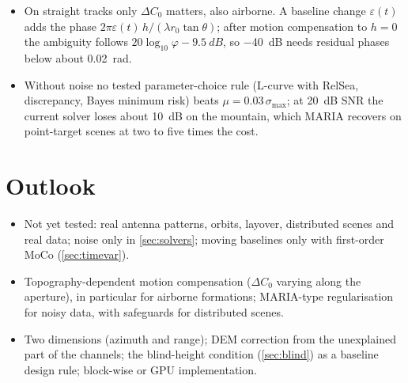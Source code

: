 \begin{itemize}
  \item On straight tracks only $\Delta C_0$ matters, also airborne. A baseline change $\varepsilon(t)$ adds the phase
        $2\pi\varepsilon(t)\,h/(\lambda r_0\tan\theta)$; after motion compensation to $h=0$ the ambiguity follows
        $20\log_{10}\varphi-\SI{9.5}{dB}$, so \SI{-40}{dB} needs residual phases below about \SI{0.02}{rad}.
  \item Without noise no tested parameter-choice rule (L-curve with RelSea, discrepancy, Bayes minimum risk) beats
        $\mu=0.03\,\sigma_{\max}$; at \SI{20}{dB} SNR the current solver loses about \SI{10}{dB} on the mountain, which MARIA
        recovers on point-target scenes at two to five times the cost.
\end{itemize}

\section{Outlook}

\begin{itemize}
  \item Not yet tested: real antenna patterns, orbits, layover, distributed scenes and real data; noise only in
        \cref{sec:solvers}; moving baselines only with first-order MoCo (\cref{sec:timevar}).
  \item Topography-dependent motion compensation ($\Delta C_0$ varying along the aperture), in particular for airborne
        formations; MARIA-type regularisation for noisy data, with safeguards for distributed scenes.
  \item Two dimensions (azimuth and range); DEM correction from the unexplained part of the channels; the blind-height
        condition (\cref{sec:blind}) as a baseline design rule; block-wise or GPU implementation.
\end{itemize}
